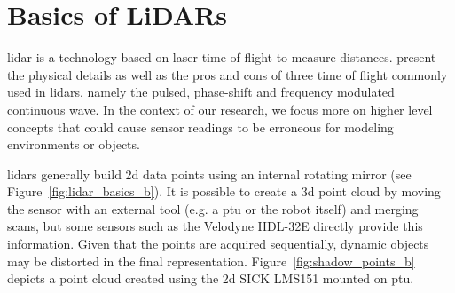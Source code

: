 \section{Basics of LiDARs}
\label{sec:chap_lidar_basics}

\gls*{lidar} is a technology based on laser time of flight to measure distances. \citet{lidar_basics} present the physical details as well as the pros and cons of three time of flight commonly used in \gls*{lidar}s, namely the pulsed, phase-shift and frequency modulated continuous wave. In the context of our research, we focus more on higher level concepts that could cause sensor readings to be erroneous for modeling environments or objects. 

\gls*{lidar}s generally build \gls*{2d} data points using an internal rotating mirror (see Figure~\ref{fig:lidar_basics_b}). It is possible to create a \gls*{3d} point cloud by moving the sensor with an external tool (e.g. a \gls*{ptu} or the robot itself) and merging scans, but some sensors such as the Velodyne HDL-32E directly provide this information. Given that the points are acquired sequentially, dynamic objects may be distorted in the final representation. Figure~\ref{fig:shadow_points_b} depicts a point cloud created using the \gls*{2d} SICK LMS151 mounted on \gls*{ptu}.

